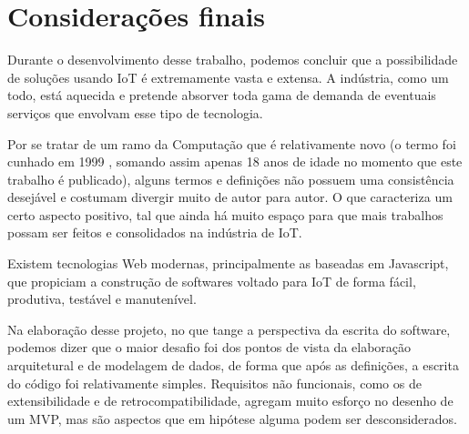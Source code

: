 \section*{Considerações finais}

Durante o desenvolvimento desse trabalho, podemos concluir que a possibilidade de soluções usando IoT é extremamente vasta e extensa. A indústria, como um todo, está aquecida e pretende absorver toda gama de demanda de eventuais serviços que envolvam esse tipo de tecnologia.

Por se tratar de um ramo da Computação que é relativamente novo (o termo foi cunhado em 1999 \cite{Kevin}, somando assim apenas 18 anos de idade no momento que este trabalho é publicado), alguns termos e definições não possuem uma consistência desejável e costumam divergir muito de autor para autor. O que caracteriza um certo aspecto positivo, tal que ainda há muito espaço para que mais trabalhos possam ser feitos e consolidados na indústria de IoT.

Existem tecnologias Web modernas, principalmente as baseadas em Javascript, que propiciam a construção de softwares voltado para IoT de forma fácil, produtiva, testável e manutenível.

Na elaboração desse projeto, no que tange a perspectiva da escrita do software, podemos dizer que o maior desafio foi dos pontos de vista da elaboração arquitetural e de modelagem de dados, de forma que após as definições, a escrita do código foi relativamente simples. Requisitos não funcionais, como os de extensibilidade e de retrocompatibilidade, agregam muito esforço no desenho de um MVP, mas são aspectos que em hipótese alguma podem ser desconsiderados.


